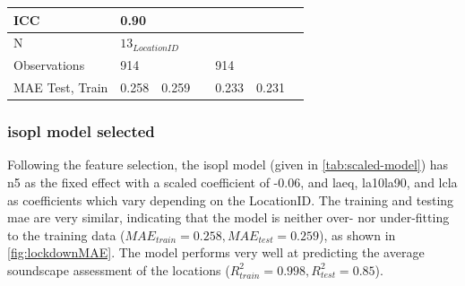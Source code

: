 \begin{table}[h!]
\begin{tabular}{@{}l|lccccc@{}}
    ICC                                      &
    0.90                                     &
    \multicolumn{1}{l}{}                     &
    \multicolumn{1}{l}{}                     &
    \multicolumn{1}{l}{}                     &
    \multicolumn{1}{l}{}                     &
    \multicolumn{1}{l}{}                                                                                                                                                                               \\ \midrule
    N                                        & \multicolumn{6}{l}{$13_{LocationID}$}                                                                                                                   \\
    Observations                             &
    914                                      &
    \multicolumn{1}{l}{}                     &
    \multicolumn{1}{l}{}                     &
    \multicolumn{1}{l}{914}                  &
    \multicolumn{1}{l}{}                     &
    \multicolumn{1}{l}{}                                                                                                                                                                               \\

    MAE Test, Train                          &
    0.258                                    &
    0.259                                    &
                                             &
    \multicolumn{1}{l}{0.233}                &
    0.231                                                                                                                                                                                              \\

    \bottomrule
  \end{tabular}
\end{table}

\subsubsection{\gls{isopl} model selected}

   Following the feature selection, the \gls{isopl} model (given in \cref{tab:scaled-model}) has \gls{n5} as the fixed effect with a scaled coefficient of -0.06, and \gls{laeq}, \gls{la10la90}, and \gls{lcla} as coefficients which vary depending on the LocationID. The training and testing \gls{mae} are very similar, indicating that the model is neither over- nor under-fitting to the training data ($MAE_{train}=0.258, MAE_{test}=0.259$), as shown in \cref{fig:lockdownMAE}. The model performs very well at predicting the average soundscape assessment of the locations ($R^2_{train}=0.998, R^2_{test}=0.85$).

